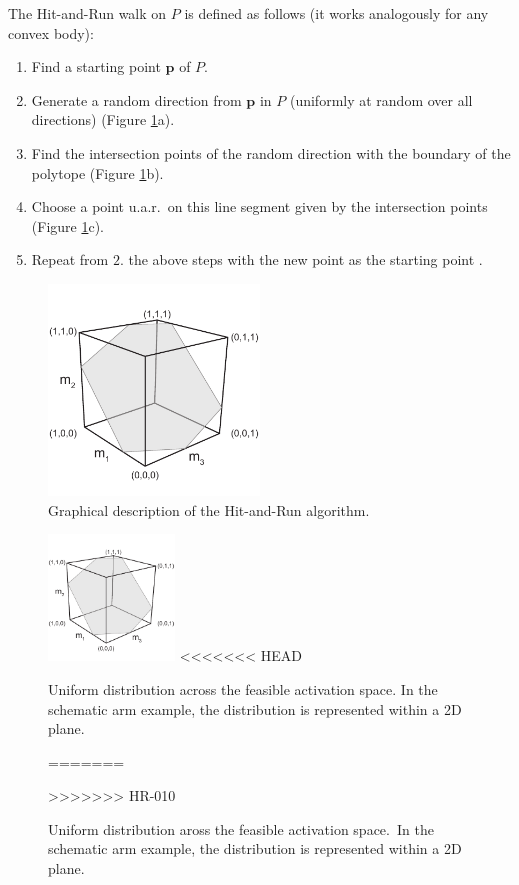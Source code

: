 The Hit-and-Run walk on $P$ is defined as follows (it works analogously for any convex body):
\begin{enumerate}
\item Find a starting point $\textbf{p}$ of $P$. %
\item Generate a random direction from $\textbf{p}$ in $P$ (uniformly at random over all directions) (Figure \ref{fig:hitruncube}a).
\item Find the intersection points of the random direction with the boundary of the polytope (Figure \ref{fig:hitruncube}b).
\item Choose a point u.a.r.\ on this line segment given by the intersection points (Figure \ref{fig:hitruncube}c). 
\item Repeat from $2.$ the above steps with the new point as the starting point .
\end{enumerate}

\begin{figure}[h]
\centering
\includegraphics[width=0.5\textwidth,page=10]{sections/figs/HitandRunSchematics_all.pdf}
\caption{Graphical description of the Hit-and-Run algorithm.}
\label{fig:hitruncube}
\end{figure}

\begin{figure}[h]
\centering
\includegraphics[width=0.3\textwidth,page=9]{sections/figs/HitandRunSchematics_all.pdf}
<<<<<<< HEAD
\caption{Uniform distribution across the feasible activation space. In the schematic arm example, the distribution is represented within a 2D plane.}
=======
\caption{Uniform distribution aross the feasible activation space.\ In the schematic arm example, the distribution is represented within a 2D plane.}
>>>>>>> HR-010
\label{fig:posthitrun_distribution}
\end{figure}

